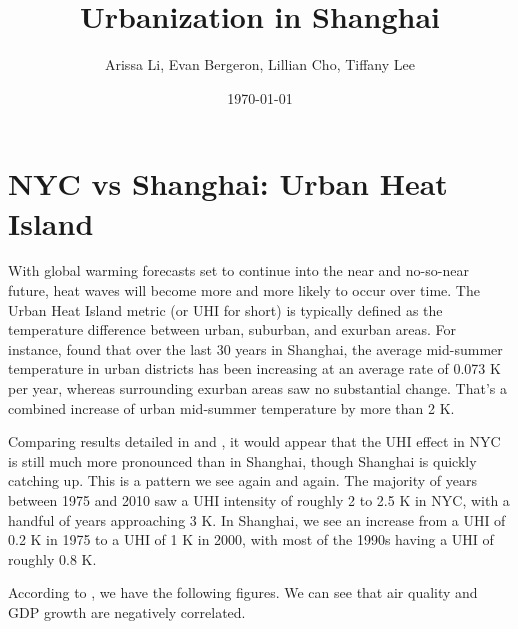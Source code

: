\documentclass[12pt]{article}
\title{Urbanization in Shanghai}
\author{%
Arissa Li,
Evan Bergeron,
Lillian Cho,
Tiffany Lee
}
\date{\today}
\begin{document}
\maketitle
\section{NYC vs Shanghai: Urban Heat Island}

With global warming forecasts set to continue into the near and
no-so-near future, heat waves will become more and more likely to
occur over time. The Urban Heat Island metric (or UHI for short) is
typically defined as the temperature difference between urban,
suburban, and exurban areas. For instance, \cite{Tan2010} found that
over the last 30 years in Shanghai, the average mid-summer temperature
in urban districts has been increasing at an average rate of 0.073 K
per year, whereas surrounding exurban areas saw no substantial
change. That's a combined increase of urban mid-summer temperature by
more than 2 K.

Comparing results detailed in \cite{Gaffin2008} and \cite{Tan2010}, it
would appear that the UHI effect in NYC is still much more pronounced
than in Shanghai, though Shanghai is quickly catching up. This is a
pattern we see again and again. The majority of years between 1975 and
2010 saw a UHI intensity of roughly 2 to 2.5 K in NYC, with a handful
of years approaching 3 K. In Shanghai, we see an increase from a UHI
of 0.2 K in 1975 to a UHI of 1 K in 2000, with most of the 1990s
having a UHI of roughly 0.8 K.

According to \cite{Xia2014}, we have the following figures. We can see
that air quality and GDP growth are negatively correlated.
\end{document}
